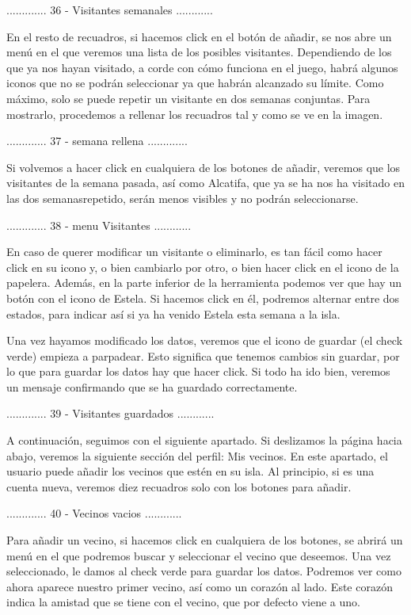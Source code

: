 ............. 36 - Visitantes semanales ............

En el resto de recuadros, si hacemos click en el botón de añadir, se nos abre un menú en el que
veremos una lista de los posibles visitantes. Dependiendo de los que ya nos hayan visitado, a corde
con cómo funciona en el juego, habrá algunos iconos que no se podrán seleccionar ya que habrán alcanzado
su límite. Como máximo, solo se puede repetir un visitante en dos semanas conjuntas. Para mostrarlo, 
procedemos a rellenar los recuadros tal y como se ve en la imagen.

............. 37 - semana rellena ............. 

Si volvemos a hacer click en cualquiera de los botones de añadir, veremos que los visitantes
de la semana pasada, así como Alcatifa, que ya se ha nos ha visitado en las dos semanasrepetido, 
serán menos visibles y no podrán seleccionarse.

............. 38 - menu Visitantes ............

En caso de querer modificar un visitante o eliminarlo, es tan fácil como hacer click en su icono y, o
bien cambiarlo por otro, o bien hacer click en el icono de la papelera. Además, en la parte inferior
de la herramienta podemos ver que hay un botón con el icono de Estela. Si hacemos click en él, podremos
alternar entre dos estados, para indicar así si ya ha venido Estela esta semana a la isla.

Una vez hayamos modificado los datos, veremos que el icono de guardar (el check verde) empieza a parpadear.
Esto significa que tenemos cambios sin guardar, por lo que para guardar los datos hay que hacer click.
Si todo ha ido bien, veremos un mensaje confirmando que se ha guardado correctamente.

............. 39 - Visitantes guardados ............

A continuación, seguimos con el siguiente apartado. Si deslizamos la página hacia abajo, veremos la siguiente
sección del perfil: Mis vecinos. En este apartado, el usuario puede añadir los vecinos que estén en
su isla. Al principio, si es una cuenta nueva, veremos diez recuadros solo con los botones para añadir.

............. 40 - Vecinos vacios ............

Para añadir un vecino, si hacemos click en cualquiera de los botones, se abrirá un menú en el que 
podremos buscar y seleccionar el vecino que deseemos. Una vez seleccionado, le damos al check verde
para guardar los datos. Podremos ver como ahora aparece nuestro primer vecino, así como un corazón
al lado. Este corazón indica la amistad que se tiene con el vecino, que por defecto viene a uno.

